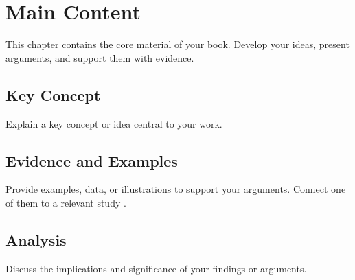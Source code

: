 \chapter{Main Content}

This chapter contains the core material of your book. Develop your ideas, present arguments, and support them with evidence.

\section{Key Concept}

Explain a key concept or idea central to your work.

\section{Evidence and Examples}

Provide examples, data, or illustrations to support your arguments. Connect
one of them to a relevant study \cite{researcher2021}.

\section{Analysis}

Discuss the implications and significance of your findings or arguments.
